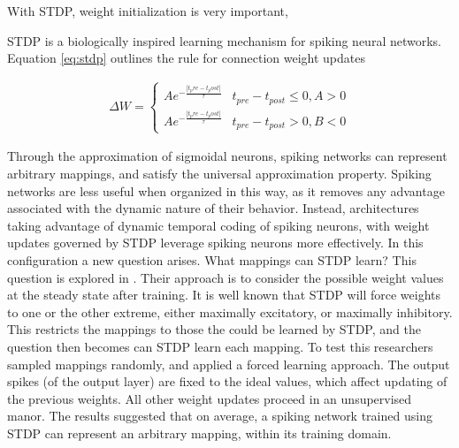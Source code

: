     
    With STDP, weight initialization is very important, 
    
    STDP is a biologically inspired learning mechanism for spiking neural
    networks. Equation \ref{eq:stdp} outlines the rule for connection weight
    updates
    
    \begin{align}
        \Delta W =
        \begin{cases} 
          Ae^{-\frac{|t_pre-t_post|}{\tau}} & t_{pre} - t_{post} \leq 0, A > 0
          \\ Ae^{-\frac{|t_pre-t_post|}{\tau}} & t_{pre} - t_{post} > 0, B < 0
       \end{cases} \label{eq:stdp}
    \end{align}
    
    Through the approximation of sigmoidal neurons, spiking networks can
    represent arbitrary mappings, and satisfy the universal approximation
    property. Spiking networks are less useful when organized in this way, as it
    removes any advantage associated with the dynamic nature of their
    behavior. Instead, architectures taking advantage of dynamic temporal coding
    of spiking neurons, with weight updates governed by STDP leverage spiking
    neurons more effectively. In this configuration a new question arises. What
    mappings can STDP learn? This question is explored in
    \cite{legenstein_2005}. Their approach is to consider the possible weight
    values at the steady state after training. It is well known that STDP will
    force weights to one or the other extreme, either maximally excitatory, or
    maximally inhibitory. This restricts the mappings to those the could be
    learned by STDP, and the question then becomes can STDP learn each
    mapping. To test this researchers sampled mappings randomly, and applied a
    forced learning approach. The output spikes (of the output layer) are fixed
    to the ideal values, which affect updating of the previous weights. All
    other weight updates proceed in an unsupervised manor. The results suggested
    that on average, a spiking network trained using STDP can represent an
    arbitrary mapping, within its training domain.
    
